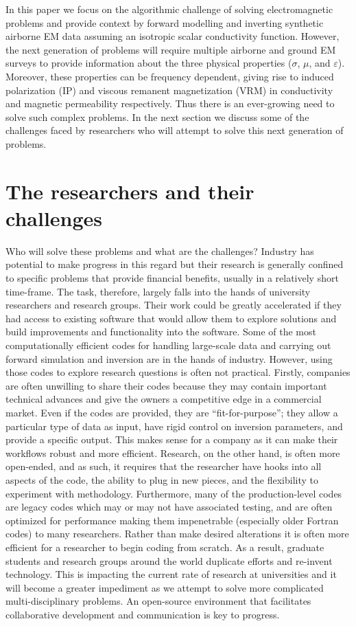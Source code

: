 \documentclass[paper]{geophysics}
\begin{document}
In this paper we focus on the algorithmic challenge of solving electromagnetic problems and provide context by forward modelling and inverting synthetic airborne EM data assuming an isotropic scalar conductivity function. However, the next generation of problems will require multiple airborne and ground EM surveys to provide information about the three physical properties ($\sigma$, $\mu$, and $\varepsilon$). Moreover, these properties can be frequency dependent, giving rise to induced polarization (IP) and viscous remanent magnetization (VRM)  in conductivity and magnetic permeability respectively. Thus there is an ever-growing need to solve such complex problems. In the next section we discuss some of the challenges faced by  researchers who will attempt to solve this next generation of problems.



\section{The researchers and their challenges}

Who will solve these problems and what are the challenges? Industry has potential to make progress in this regard but their research is generally confined to specific problems that provide financial benefits, usually in a relatively short time-frame. The task, therefore, largely falls into the hands of university researchers and research groups. Their work could be greatly accelerated if they had access to existing software that would allow them to explore solutions and build improvements and functionality into the software. Some of the most computationally efficient codes for handling large-scale data and carrying out forward simulation and inversion are in the hands of industry. However, using those codes to explore research questions is often not practical. Firstly, companies are often unwilling to share their codes because they may contain important technical advances and give the owners a competitive edge in a commercial market. Even if the codes are provided, they are ``fit-for-purpose''; they allow a particular type of data as input, have rigid control on inversion parameters, and provide a specific output. This makes sense for a company as it can make their workflows robust and more efficient. Research, on the other hand, is often more open-ended, and as such, it requires that the researcher have hooks into all aspects of the code, the ability to plug in new pieces, and the flexibility to experiment with methodology. Furthermore, many of the production-level codes are legacy codes which may or may not have associated testing, and are often optimized for performance making them impenetrable (especially older Fortran codes) to many researchers. Rather than make desired alterations it is often more efficient for a researcher to begin coding from scratch. As a result, graduate students and research groups around the world duplicate efforts and re-invent technology. This is impacting the current rate of research at universities and it will become a greater impediment as we attempt to solve more complicated multi-disciplinary problems. An open-source environment that facilitates collaborative development and communication is key to progress.
\end{document}
